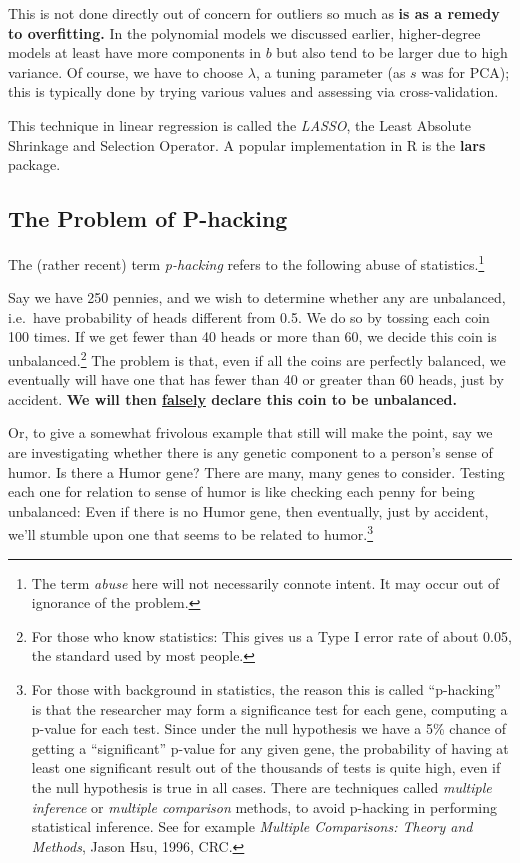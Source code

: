 This is not done directly out of concern for outliers so much as
\textbf{is as a remedy to overfitting.}  In the polynomial models we
discussed earlier, higher-degree models at least have more components in
$b$ but also tend to be larger due to high variance.  Of course, we have
to choose $\lambda$, a tuning parameter (as $s$ was for PCA); this is
typically done by trying various values and assessing via
cross-validation.

This technique in linear regression is called the \textit{LASSO},
the Least Absolute Shrinkage and Selection Operator.  A popular
implementation in R is the \textbf{lars} package.

\subsection{The Problem of P-hacking}

The (rather recent) term \textit{p-hacking} refers to the following
abuse of statistics.\footnote{The term \textit{abuse} here will not
necessarily connote intent. It may occur out of ignorance of the
problem.}

Say we have 250 pennies, and we wish to determine whether any are
unbalanced, i.e.\ have probability of heads different from 0.5.  We do
so by tossing each coin 100 times.  If we get fewer than 40 heads or
more than 60, we decide this coin is unbalanced.\footnote{For those who
know statistics:  This gives us a Type I error rate of about 0.05, the
standard used by most people.}  The problem is that, even if all the
coins are perfectly balanced, we eventually will have one that has fewer
than 40 or greater than 60 heads, just by accident.  \textbf{We will
then \underline{falsely} declare this coin to be unbalanced.}

Or, to give a somewhat frivolous example that still will make the point,
say we are investigating whether there is any genetic component to a
person's sense of humor.  Is there a Humor gene?  There are many, many
genes to consider.  Testing each one for relation to sense of humor is
like checking each penny for being unbalanced: Even if there is no Humor
gene, then eventually, just by accident, we'll stumble upon one that
seems to be related to humor.\footnote{For those with background in
statistics, the reason this is called ``p-hacking'' is that the
researcher may form a significance test for each gene, computing a
p-value for each test.  Since under the null hypothesis we have a 5\%
chance of getting a ``significant'' p-value for any given gene, the
probability of having at least one significant result out of the
thousands of tests is quite high, even if the null hypothesis is true in
all cases.  There are techniques called \textit{multiple inference} or
\textit{multiple comparison} methods, to avoid p-hacking in performing
statistical inference.  See for example \textit{Multiple Comparisons:
Theory and Methods}, Jason Hsu, 1996, CRC.}

